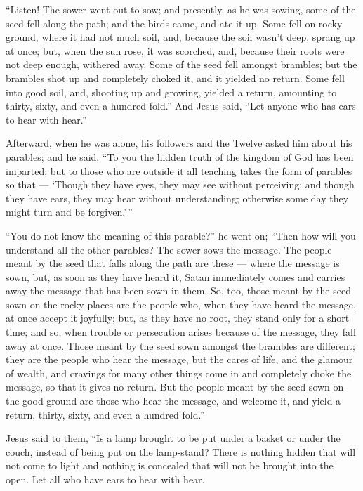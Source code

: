  ``Listen! The sower went out to sow;  and
presently, as he was sowing, some of the seed fell along the path; and
the birds came, and ate it up.  Some fell on rocky ground,
where it had not much soil, and, because the soil wasn't deep, sprang up
at once;  but, when the sun rose, it was scorched, and,
because their roots were not deep enough, withered away. 
Some of the seed fell amongst brambles; but the brambles shot up and
completely choked it, and it yielded no return.  Some fell
into good soil, and, shooting up and growing, yielded a return,
amounting to thirty, sixty, and even a hundred fold.''  And
Jesus said, ``Let anyone who has ears to hear with hear.''

 Afterward, when he was alone, his followers and the Twelve
asked him about his parables;  and he said, ``To you the
hidden truth of the kingdom of God has been imparted; but to those who
are outside it all teaching takes the form of parables so that ---
 `Though they have eyes, they may see without perceiving;
and though they have ears, they may hear without understanding;
otherwise some day they might turn and be forgiven.'\,''

 ``You do not know the meaning of this parable?'' he went
on; ``Then how will you understand all the other parables? 
The sower sows the message.  The people meant by the seed
that falls along the path are these --- where the message is sown, but,
as soon as they have heard it, Satan immediately comes and carries away
the message that has been sown in them.  So, too, those
meant by the seed sown on the rocky places are the people who, when they
have heard the message, at once accept it joyfully;  but,
as they have no root, they stand only for a short time; and so, when
trouble or persecution arises because of the message, they fall away at
once.  Those meant by the seed sown amongst the brambles
are different; they are the people who hear the message, 
but the cares of life, and the glamour of wealth, and cravings for many
other things come in and completely choke the message, so that it gives
no return.  But the people meant by the seed sown on the
good ground are those who hear the message, and welcome it, and yield a
return, thirty, sixty, and even a hundred fold.''

 Jesus said to them, ``Is a lamp brought to be put under a
basket or under the couch, instead of being put on the lamp-stand?
 There is nothing hidden that will not come to light and
nothing is concealed that will not be brought into the open.
 Let all who have ears to hear with hear.

